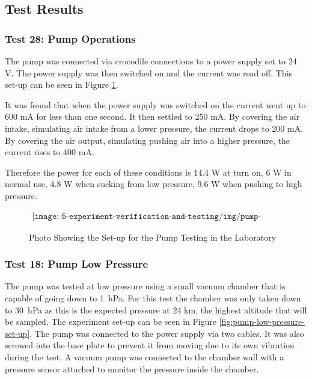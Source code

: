 \pagebreak

\subsection{Test Results}

\subsubsection{Test 28: Pump Operations}
\label{sec:test28result}

The pump was connected via crocodile connections to a power supply set to 24 V. The power supply was then switched on and the current was read off. This set-up can be seen in Figure \ref{fig:pump-testing}.

It was found that when the power supply was switched on the current went up to 600 mA for less than one second. It then settled to 250 mA. By covering the air intake, simulating air intake from a lower pressure, the current drops to 200 mA. By covering the air output, simulating pushing air into a higher pressure, the current rises to 400 mA.

Therefore the power for each of these conditions is 14.4 W at turn on, 6 W in normal use, 4.8 W when sucking from low pressure, 9.6 W when pushing to high pressure.


\begin{figure}[H]
    \begin{align*}
        \texttt{[image: 5-experiment-verification-and-testing/img/pump-testing.png]}
    \end{align*}
    \caption{Photo Showing the Set-up for the Pump Testing in the Laboratory} \label{fig:pump-testing}
\end{figure}

\subsubsection{Test 18: Pump Low Pressure}\label{subsection:pumplowpressuretest}

The pump was tested at low pressure using a small vacuum chamber that is capable of going down to \SI{1}{\hecto\pascal}. For this test the chamber was only taken down to \SI{30}{\hecto\pascal} as this is the expected pressure at 24 km, the highest altitude that will be sampled. The experiment set-up can be seen in Figure \ref{fig:pump-low-pressure-set-up}. The pump was connected to the power supply via two cables. It was also screwed into the base plate to prevent it from moving due to its own vibration during the test. A vacuum pump was connected to the chamber wall with a pressure sensor attached to monitor the pressure inside the chamber. 

